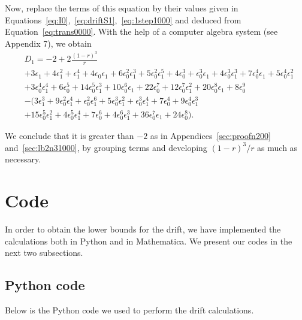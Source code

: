 \documentclass[11pt]{article}
\theoremstyle{plain}
\theoremstyle{definition}
\theoremstyle{remark}
\begin{document}
Now, replace the terms of this equation by their values given in Equations~\eqref{eq:I0},~\eqref{eq:driftS1},~\eqref{eq:1step1000} and deduced from Equation~\eqref{eq:trans0000}. With the help of a computer algebra system (see Appendix 7), we obtain
\begin{align*}
& D_1 = -2 + 2 \frac{(1-r)^3}{r}\\
& + 3 \epsilon_1 + 4 \epsilon_1^2 + \epsilon_1^4 + 4 \epsilon_0 \epsilon_1 + 6 \epsilon_0^2 \epsilon_1^3  + 5 \epsilon_0^2 \epsilon_1^5 + 4 \epsilon_0^3 + \epsilon_0^3 \epsilon_1 + 4 \epsilon_0^3 \epsilon_1^3 + 7 \epsilon_0^4 \epsilon_1 + 5 \epsilon_0^4 \epsilon_1^2 \\
& + 3 \epsilon_0^4 \epsilon_1^4 + 6 \epsilon_0^5 + 14 \epsilon_0^5 \epsilon_1^3 + 10 \epsilon_0^6 \epsilon_1 + 22 \epsilon_0^7 + 12 \epsilon_0^7 \epsilon_1^2 +20 \epsilon_0^8 \epsilon_1 + 8 \epsilon_0^9 \\
& - (3 \epsilon_1^3 + 9 \epsilon_0^2 \epsilon_1^4 + \epsilon_0^2 \epsilon_1^6  + 5 \epsilon_0^3 \epsilon_1^2 + \epsilon_0^3 \epsilon_1^4 + 7 \epsilon_0^4 + 9 \epsilon_0^4 \epsilon_1^3 \\
& + 15 \epsilon_0^5 \epsilon_1^2 + 4 \epsilon_0^5 \epsilon_1^4 + 7 \epsilon_0^6 + 4 \epsilon_0^6 \epsilon_1^3 + 36 \epsilon_0^7 \epsilon_1 + 24 \epsilon_0^8).
\end{align*}

We conclude that it is greater than $-2$ as in Appendices~\ref{sec:proofn200} and~\ref{sec:lb2n31000}, by grouping terms and developing $(1-r)^3/r$ as much as necessary.

\section{Code}

In order to obtain the lower bounds for the drift, we have implemented the calculations both in Python and in Mathematica. We present our codes in the next two subsections.
\subsection{Python code}

Below is the Python code we used to perform the drift calculations. 
\end{document}
